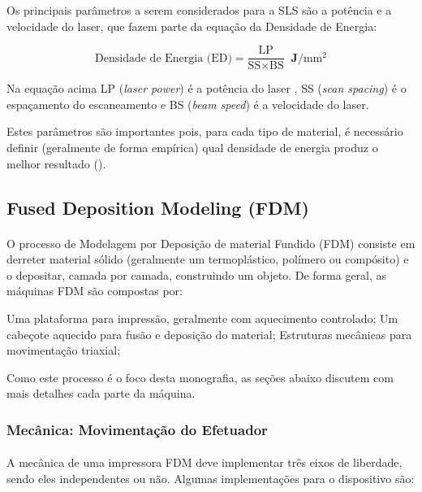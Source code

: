 \documentclass[12pt, english]{article}
\begin{document}
Os principais parâmetros a serem considerados para a SLS são a potência e a velocidade do laser, que fazem parte da equação da Densidade de Energia:

\[\textrm{Densidade de Energia (ED)} = \dfrac{\textrm{LP}}{\textrm{SS} \times \textrm{BS}} \;\; \mathbf{J}/\textrm{mm}^2 \]

Na equação acima LP (\emph{laser power}) é a potência do laser , SS (\emph{scan spacing}) é o espaçamento do escaneamento  e BS (\emph{beam speed}) é a velocidade do laser.

Estes parâmetros são importantes pois, para cada tipo de material, é necessário definir (geralmente de forma empírica) qual densidade de energia produz o melhor resultado (\cite{Goodridge2012}).

\subsection{Fused Deposition Modeling (FDM)}

\paragraph{}
O processo de Modelagem por Deposição de material Fundido (FDM) consiste em derreter material sólido (geralmente um termoplástico, polímero ou compósito) e o depositar, camada por camada, construindo um objeto.
De forma geral, as máquinas FDM são compostas por:

\par
Uma plataforma para impressão, geralmente com aquecimento controlado;
Um cabeçote aquecido para fusão e deposição do material;
Estruturas mecânicas para movimentação triaxial;

\par
Como este processo é o foco desta monografia, as seções abaixo discutem com mais detalhes cada parte da máquina.


\subsubsection{Mecânica: Movimentação do Efetuador}

\paragraph{}
A mecânica de uma impressora FDM deve implementar três eixos de liberdade, sendo eles independentes ou não. Algumas implementações para o dispositivo são:
\end{document}
